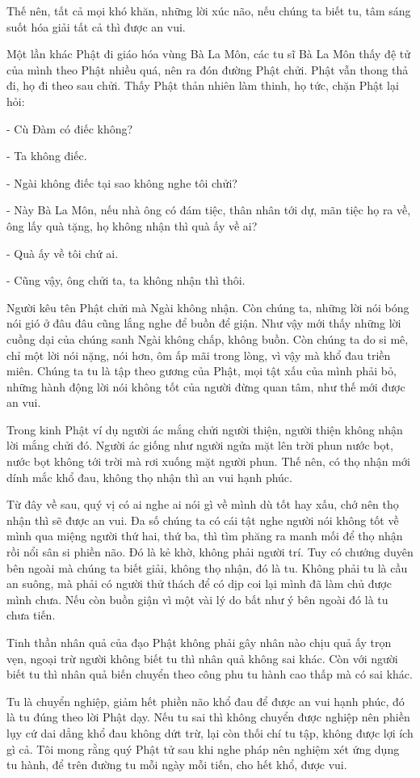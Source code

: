 \documentclass[
  12pt,
  oneside]{book}
\begin{document}
Thế nên, tất cả mọi khó khăn, những lời xúc não, nếu chúng ta biết tu, tâm sáng suốt hóa giải tất cả thì được an vui.

Một lần khác Phật đi giáo hóa vùng Bà La Môn, các tu sĩ Bà La Môn thấy đệ tử của mình theo Phật nhiều quá, nên ra đón đường Phật chửi. Phật vẫn thong thả đi, họ đi theo sau chửi. Thấy Phật thản nhiên làm thinh, họ tức, chặn Phật lại hỏi:

- Cù Đàm có điếc không?

- Ta không điếc.

- Ngài không điếc tại sao không nghe tôi chửi?

- Này Bà La Môn, nếu nhà ông có đám tiệc, thân nhân tới dự, mãn tiệc họ ra về, ông lấy quà tặng, họ không nhận thì quà ấy về ai?

- Quà ấy về tôi chứ ai.

- Cũng vậy, ông chửi ta, ta không nhận thì thôi.

Người kêu tên Phật chửi mà Ngài không nhận. Còn chúng ta, những lời nói bóng nói gió ở đâu đâu cũng lắng nghe để buồn để giận. Như vậy mới thấy những lời cuồng dại của chúng sanh Ngài không chấp, không buồn. Còn chúng ta do si mê, chỉ một lời nói nặng, nói hơn, ôm ấp mãi trong lòng, vì vậy mà khổ đau triền miên. Chúng ta tu là tập theo gương của Phật, mọi tật xấu của mình phải bỏ, những hành động lời nói không tốt của người đừng quan tâm, như thế mới được an vui.

Trong kinh Phật ví dụ người ác mắng chửi người thiện, người thiện không nhận lời mắng chửi đó. Người ác giống như người ngửa mặt lên trời phun nước bọt, nước bọt không tới trời mà rơi xuống mặt người phun. Thế nên, có thọ nhận mới dính mắc khổ đau, không thọ nhận thì an vui hạnh phúc.

Từ đây về sau, quý vị có ai nghe ai nói gì về mình dù tốt hay xấu, chớ nên thọ nhận thì sẽ được an vui. Đa số chúng ta có cái tật nghe người nói không tốt về mình qua miệng người thứ hai, thứ ba, thì tìm phăng ra manh mối để thọ nhận rồi nổi sân si phiền não. Đó là kẻ khờ, không phải người trí. Tuy có chướng duyên bên ngoài mà chúng ta biết giải, không thọ nhận, đó là tu. Không phải tu là cầu an suông, mà phải có người thử thách để có dịp coi lại mình đã làm chủ được mình chưa. Nếu còn buồn giận vì một vài lý do bất như ý bên ngoài đó là tu chưa tiến.

Tinh thần nhân quả của đạo Phật không phải gây nhân nào chịu quả ấy trọn vẹn, ngoại trừ người không biết tu thì nhân quả không sai khác. Còn với người biết tu thì nhân quả biến chuyển theo công phu tu hành cao thấp mà có sai khác.

Tu là chuyển nghiệp, giảm hết phiền não khổ đau để được an vui hạnh phúc, đó là tu đúng theo lời Phật dạy. Nếu tu sai thì không chuyển được nghiệp nên phiền lụy cứ dai dẳng khổ đau không dứt trừ, lại còn thối chí tu tập, không được lợi ích gì cả. Tôi mong rằng quý Phật tử sau khi nghe pháp nên nghiệm xét ứng dụng tu hành, để trên đường tu mỗi ngày mỗi tiến, cho hết khổ, được vui.
\end{document}
